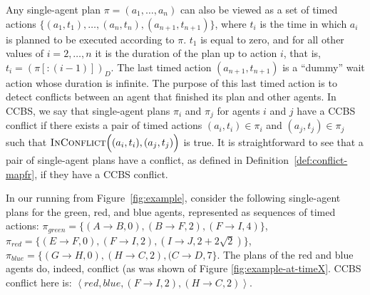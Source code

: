 \documentclass[review]{elsarticle}
\newtheorem{lemma}{Lemma}
\newcommand{\tuple}[1]{\ensuremath{\left \langle #1 \right \rangle }}
\newcommand\roni[1]{\nb{\textbf{Roni:}}{green}{#1}}
\newcommand{\ccbs}{\ac{CCBS}\xspace}
\newcommand{\inconflict}{\textsc{InConflict}\xspace}
\begin{document}
Any single-agent plan $\pi = (a_1,\ldots, a_n)$ can also be viewed as a set of timed actions $\big\{ (a_1,t_1),\ldots,(a_n,t_n) ,(a_{n+1},t_{n+1}) \big\}$, where $t_i$ is the time in which $a_i$ is planned to be executed according to $\pi$. 
$t_1$ is equal to zero, and for all other values of $i=2,\ldots, n$ it is the duration of the plan up to action $i$, that is, $t_i=(\pi[:(i-1)])_D$. 
The last timed action $(a_{n+1}, t_{n+1})$ is a ``dummy'' wait action whose duration is infinite. The purpose of this last timed action is to detect conflicts between an agent that finished its plan and other agents. 
In \ccbs, we say that single-agent plans $\pi_i$ and $\pi_j$ for agents $i$ and $j$ have a \ccbs  conflict if there exists a pair of timed actions $(a_i,t_i)\in \pi_i$ and $(a_j,t_j)\in \pi_j$ such that $\inconflict \Big((a_i,t_i), (a_j,t_j)\Big)$ is true. 
It is straightforward to see that a pair of single-agent plans 
have a conflict, as defined in Definition~\ref{def:conflict-mapfr},
if they have a \ccbs conflict.


In our running from Figure~\ref{fig:example}, consider the following single-agent plans for the green, red, and blue agents, represented as sequences of timed actions:  $\pi_{green}=\{(A \rightarrow B, 0), (B \rightarrow F, 2), (F \rightarrow I, 4)\}$, $\pi_{red}=\{(E \rightarrow F, 0), (F \rightarrow I, 2), (I \rightarrow J, 2+2\sqrt{2})\}$, $\pi_{blue}=\{(G \rightarrow H, 0), (H \rightarrow C, 2), (C \rightarrow D, 7\}$. The plans of the red and blue agents do, indeed, conflict (as was shown of Figure \ref{fig:example-at-timeX}. \ccbs conflict here is: $\tuple{red, blue, (F \rightarrow I, 2), (H \rightarrow C, 2)}$.  


\end{document}
